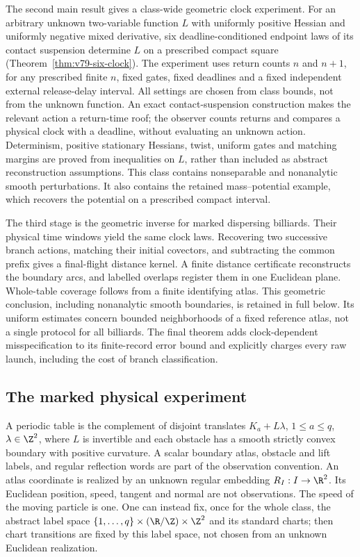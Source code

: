 The second main result gives a class-wide geometric clock experiment.
For an arbitrary unknown two-variable function $L$ with uniformly positive
Hessian and uniformly negative mixed derivative, six deadline-conditioned
endpoint laws of its contact suspension determine $L$ on a prescribed
compact square (Theorem~\ref{thm:v79-six-clock}).  The experiment uses
return counts $n$ and $n+1$, for any prescribed finite $n$, fixed gates,
fixed deadlines and a fixed independent external release-delay interval.
All settings are chosen from class bounds, not from the unknown function.
An exact contact-suspension construction makes the relevant action a
return-time roof; the observer counts returns and compares a physical
clock with a deadline, without evaluating an unknown action.  Determinism,
positive stationary Hessians, twist, uniform gates and matching margins
are proved from inequalities on $L$, rather than included as abstract
reconstruction assumptions.  This class contains nonseparable and
nonanalytic smooth perturbations.  It also contains the retained
mass--potential example, which recovers the potential on a prescribed
compact interval.

The third stage is the geometric inverse for marked dispersing billiards.
Their physical time windows yield the same clock laws.  Recovering two
successive branch actions, matching their initial covectors, and
subtracting the common prefix gives a final-flight distance kernel.
A finite distance certificate reconstructs the boundary arcs, and
labelled overlaps register them in one Euclidean plane.  Whole-table
coverage follows from a finite identifying atlas.  This geometric
conclusion, including nonanalytic smooth boundaries, is retained in
full below.  Its uniform estimates concern bounded neighborhoods of
a fixed reference atlas, not a single protocol for all billiards.
The final theorem adds clock-dependent misspecification to its
finite-record error bound and explicitly charges every raw launch,
including the cost of branch classification.

\subsection{The marked physical experiment}
A periodic table is the complement of disjoint translates
$K_a+L\lambda$, $1\le a\le q$, $\lambda\in\Z^2$, where $L$ is
invertible and each obstacle has a smooth strictly convex boundary with
positive curvature.  A scalar boundary atlas, obstacle and lift labels,
and regular reflection words are part of the observation convention.
An atlas coordinate is realized by an unknown regular embedding
$R_I:I\to\R^2$.  Its Euclidean position, speed, tangent and normal are
not observations.  The speed of the moving particle is one.  One can
instead fix, once for the whole class, the abstract label space
$\{1,\ldots,q\}\times(\R/\Z)\times\Z^2$ and its standard charts;
then chart transitions are fixed by this label space, not chosen from
an unknown Euclidean realization.

